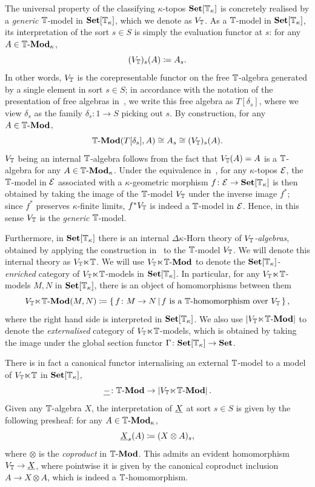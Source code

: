 The universal property of the classifying $\kappa$-topos $\mathbf{Set}[\mathbb{T}_\kappa]$ is concretely realised by a \emph{generic} $\mathbb{T}$-model in $\mathbf{Set}[\mathbb{T}_\kappa]$, which we denote as $V_{\mathbb{T}}$. As a $\mathbb{T}$-model in $\mathbf{Set}[\mathbb{T}_\kappa]$, its interpretation of the sort $s\in S$ is simply the evaluation functor at $s$: for any $A\in\mathbb{T}\text{-}\mathbf{Mod}_\kappa$, 
\[ (V_{\mathbb{T}})_s(A) \coloneq A_s. \]
In other words, $V_{\mathbb{T}}$ is the corepresentable functor on the free $\mathbb{T}$-algebra generated by a single element in sort $s\in S$; in accordance with the notation of the presentation of free algebras in~, we write this free algebra as $T[\delta_s]$, where we view $\delta_s$ as the family $\delta_s \colon 1 \to S$ picking out $s$. By construction, for any $A\in\mathbb{T}\text{-}\mathbf{Mod}$,
\[ \mathbb{T}\text{-}\mathbf{Mod}(T[\delta_s],A) \cong A_s \cong (V_{\mathbb{T}})_s(A). \]
$V_{\mathbb{T}}$ being an internal $\mathbb{T}$-algebra follows from the fact that $V_{\mathbb{T}}(A) = A$ is a $\mathbb{T}$-algebra for any $A\in\mathbb{T}\text{-}\mathbf{Mod}_\kappa$. Under the equivalence in~, for any $\kappa$-topos $\mathcal{E}$, the $\mathbb{T}$-model in $\mathcal{E}$ associated with a $\kappa$-geometric morphism $f \colon \mathcal{E} \to \mathbf{Set}[\mathbb{T}_\kappa]$ is then obtained by taking the image of the $\mathbb{T}$-model $V_{\mathbb{T}}$ under the inverse image $f^*$; since $f^*$ preserves $\kappa$-finite limits, $f^*V_{\mathbb{T}}$ is indeed a $\mathbb{T}$-model in $\mathcal{E}$. Hence, in this sense $V_{\mathbb{T}}$ is the \emph{generic} $\mathbb{T}$-model.

Furthermore, in $\mathbf{Set}[\mathbb{T}_\kappa]$ there is an internal $\Delta\kappa$-Horn theory of \emph{$V_{\mathbb{T}}$-algebras}, obtained by applying the construction in~ to the $\mathbb{T}$-model $V_{\mathbb{T}}$. We will denote this internal theory as $V_{\mathbb{T}}\hspace{-.4ex}\ltimes\hspace{-.4ex}\mathbb{T}$. We will use $V_{\mathbb{T}}\hspace{-.4ex}\ltimes\hspace{-.4ex}\mathbb{T}\text{-}\mathbf{Mod}$ to denote the \emph{$\mathbf{Set}[\mathbb{T}_\kappa]$-enriched} category of $V_{\mathbb{T}}\hspace{-.4ex}\ltimes\hspace{-.4ex}\mathbb{T}$-models in $\mathbf{Set}[\mathbb{T}_\kappa]$. In particular, for any $V_{\mathbb{T}}\hspace{-.4ex}\ltimes\hspace{-.4ex}\mathbb{T}$-models $M,N$ in $\mathbf{Set}[\mathbb{T}_\kappa]$, there is an object of homomorphisms between them
\[ {V_{\mathbb{T}}\hspace{-.4ex}\ltimes\hspace{-.4ex}\mathbb{T}\text{-}\mathbf{Mod}}(M,N) \coloneq \left\{\,f \colon M \to N\,\middle|\,f \text{ is a $\mathbb{T}$-homomorphism over $V_{\mathbb{T}}$}\,\right\}, \]
where the right hand side is interpreted in $\mathbf{Set}[\mathbb{T}_\kappa]$. We also use $\left|V_{\mathbb{T}}\hspace{-.4ex}\ltimes\hspace{-.4ex}\mathbb{T}\text{-}\mathbf{Mod}\right|$ to denote the \emph{externalised} category of $V_{\mathbb{T}}\hspace{-.4ex}\ltimes\hspace{-.4ex}\mathbb{T}$-models, which is obtained by taking the image under the global section functor $\Gamma \colon \mathbf{Set}[\mathbb{T}_\kappa] \to \mathbf{Set}$. 

There is in fact a canonical functor internalising an external $\mathbb{T}$-model to a model of $V_{\mathbb{T}}\hspace{-.4ex}\ltimes\hspace{-.4ex}\mathbb{T}$ in $\mathbf{Set}[\mathbb{T}_\kappa]$,
\[ \underline{-} \colon \mathbb{T}\text{-}\mathbf{Mod} \to \left|V_{\mathbb{T}}\hspace{-.4ex}\ltimes\hspace{-.4ex}\mathbb{T}\text{-}\mathbf{Mod}\right|. \]
Given any $\mathbb{T}$-algebra $X$, the interpretation of $\underline{X}$ at sort $s\in S$ is given by the following presheaf: for any $A\in\mathbb{T}\text{-}\mathbf{Mod}_\kappa$,
\[ \underline{X}_s(A) \coloneq (X \otimes A)_s, \]
where $\otimes$ is the \emph{coproduct} in $\mathbb{T}\text{-}\mathbf{Mod}$. This admits an evident homomorphism $V_{\mathbb{T}} \to \underline{X}$, where pointwise it is given by the canonical coproduct inclusion $A \to X \otimes A$, which is indeed a $\mathbb{T}$-homomorphism.

